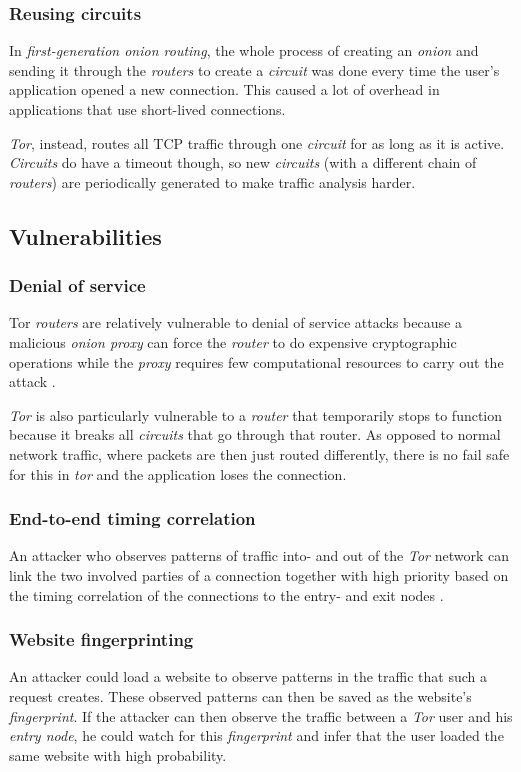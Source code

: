 \documentclass{sig-alternate}
\begin{document}
\subsubsection{Reusing circuits}
In \emph{first-generation onion routing}, the whole process of creating an \emph{onion} and sending
it through the \emph{routers} to create a \emph{circuit} was done every time the user's application
opened a new connection. This caused a lot of overhead in applications that use short-lived connections.

\emph{Tor}, instead, routes all TCP traffic through one \emph{circuit} for as long as it is active.
\emph{Circuits} do have a timeout though, so new \emph{circuits} (with a different chain of \emph{routers})
are periodically generated to make traffic analysis harder.

\subsection{Vulnerabilities}

\subsubsection{Denial of service}
Tor \emph{routers} are relatively vulnerable to denial of service attacks because a malicious
\emph{onion proxy} can force the \emph{router} to do expensive cryptographic operations while
the \emph{proxy} requires few computational resources to carry out the attack \cite{tor2004}.

\emph{Tor} is also particularly vulnerable to a \emph{router} that temporarily stops to function
because it breaks all \emph{circuits} that go through that router. As opposed to normal network
traffic, where packets are then just routed differently, there is no fail safe for this in \emph{tor}
and the application loses the connection.

\subsubsection{End-to-end timing correlation}
An attacker who observes patterns of traffic into- and out of the \emph{Tor} network can link
the two involved parties of a connection together with high priority based on the timing correlation
of the connections to the entry- and exit nodes \cite{tor2004}.

\subsubsection{Website fingerprinting}
An attacker could load a website to observe patterns in the traffic that such a request creates.
These observed patterns can then be saved as the website's \emph{fingerprint}. If the attacker
can then observe the traffic between a \emph{Tor} user and his \emph{entry node}, he could watch
for this \emph{fingerprint} and infer that the user loaded the same website with high probability.
\end{document}
